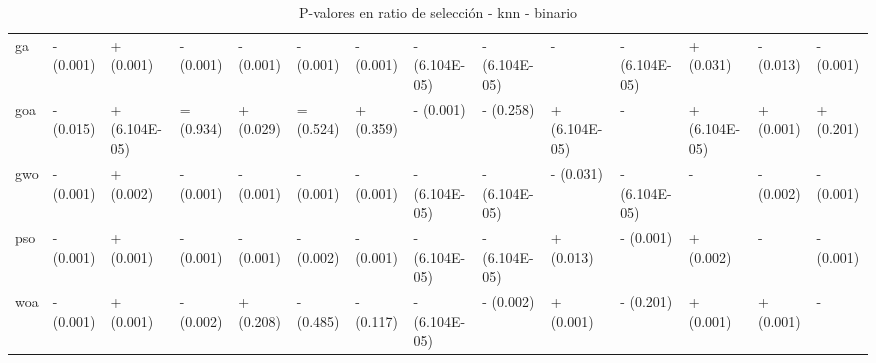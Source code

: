 \begin{table}
\begin{adjustbox}{width=\linewidth}
\begin{tabular}{llllllllllllll}
            ga    & - (0.001)     & + (0.001)     & - (0.001)     & - (0.001)     & - (0.001) & - (0.001)     & - (6.104E-05) & - (6.104E-05) & -             & - (6.104E-05) & + (0.031)     & - (0.013)     & - (0.001)     \\
            goa   & - (0.015)     & + (6.104E-05) & = (0.934)     & + (0.029)     & = (0.524) & + (0.359)     & - (0.001)     & - (0.258)     & + (6.104E-05) & -             & + (6.104E-05) & + (0.001)     & + (0.201)     \\
            gwo   & - (0.001)     & + (0.002)     & - (0.001)     & - (0.001)     & - (0.001) & - (0.001)     & - (6.104E-05) & - (6.104E-05) & - (0.031)     & - (6.104E-05) & -             & - (0.002)     & - (0.001)     \\
            pso   & - (0.001)     & + (0.001)     & - (0.001)     & - (0.001)     & - (0.002) & - (0.001)     & - (6.104E-05) & - (6.104E-05) & + (0.013)     & - (0.001)     & + (0.002)     & -             & - (0.001)     \\
            woa   & - (0.001)     & + (0.001)     & - (0.002)     & + (0.208)     & - (0.485) & - (0.117)     & - (6.104E-05) & - (0.002)     & + (0.001)     & - (0.201)     & + (0.001)     & + (0.001)     & -             \\
            \bottomrule
        \end{tabular}
    \end{adjustbox}
    \caption{P-valores en ratio de selección - knn - binario}
    \label{tab:p-values_sel_ratio_bin_knn}
\end{table}

